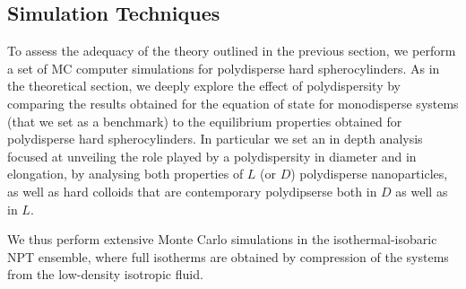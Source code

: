 \documentclass[journal=jacsat,manuscript=article]{achemso}
\begin{document}



\subsection{Simulation Techniques}
To assess the adequacy of the theory outlined in the previous section, we perform a set of MC  computer simulations for polydisperse hard spherocylinders. As in the theoretical section, we deeply explore the effect of polydispersity  by comparing the results obtained for the equation of state for monodisperse systems (that we set as a benchmark) to the equilibrium properties obtained for polydisperse hard spherocylinders. In particular we set an in depth analysis focused at unveiling the role played by a polydispersity in diameter and in elongation, by analysing both properties of $L$ (or $D$) polydisperse nanoparticles, as well as hard colloids that are contemporary polydipserse both in $D$ as well as in $L$. 

We thus perform extensive Monte Carlo simulations in the isothermal-isobaric NPT ensemble, where full isotherms are obtained by compression of the systems from the low-density isotropic fluid.
\end{document}
